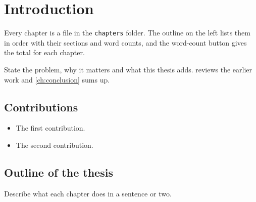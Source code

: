 \chapter{Introduction}
\label{ch:intro}

Every chapter is a file in the \texttt{chapters} folder. The outline on the left lists them in order with their
sections and word counts, and the word-count button gives the total for each chapter.

State the problem, why it matters and what this thesis adds.  reviews the earlier work and
\cref{ch:conclusion} sums up.

\section{Contributions}

\begin{itemize}
  \item The first contribution.
  \item The second contribution.
\end{itemize}

\section{Outline of the thesis}

Describe what each chapter does in a sentence or two.
